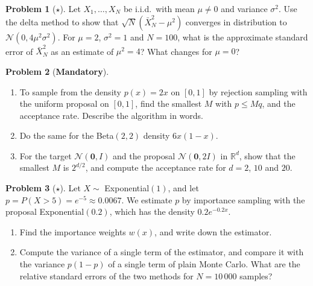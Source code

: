 \documentclass[11pt]{article}
\theoremstyle{definition}
\newtheorem{problem}{Problem}[section]
\newcommand{\mandatory}{\textcolor{red!70!black}{\textbf{Mandatory}}}
\begin{document}
\begin{problem}[$\star$]\label{pr:delta-method}
    Let $X_1, \ldots, X_N$ be i.i.d.\ with mean $\mu \neq 0$ and variance $\sigma^2$. Use the delta method to show that $\sqrt{N}(\bar X_N^2 - \mu^2)$ converges in distribution to $\mathcal{N}(0, 4\mu^2\sigma^2)$. For $\mu = 2$, $\sigma^2 = 1$ and $N = 100$, what is the approximate standard error of $\bar X_N^2$ as an estimate of $\mu^2 = 4$? What changes for $\mu = 0$?
\end{problem}

\begin{problem}[\mandatory]\label{pr:rejection}
    \begin{enumerate}[label=(\alph*)]
        \item To sample from the density $p(x) = 2x$ on $[0, 1]$ by rejection sampling with the uniform proposal on $[0, 1]$, find the smallest $M$ with $p \leq Mq$, and the acceptance rate. Describe the algorithm in words.
        \item Do the same for the Beta$(2, 2)$ density $6x(1 - x)$.
        \item For the target $\mathcal{N}(\mathbf{0}, I)$ and the proposal $\mathcal{N}(\mathbf{0}, 2I)$ in $\mathbb{R}^d$, show that the smallest $M$ is $2^{d/2}$, and compute the acceptance rate for $d = 2$, $10$ and $20$.
    \end{enumerate}
\end{problem}

\begin{problem}[$\star$]\label{pr:importance}
    Let $X \sim$ Exponential$(1)$, and let $p = P(X > 5) = e^{-5} \approx 0.0067$. We estimate $p$ by importance sampling with the proposal Exponential$(0.2)$, which has the density $0.2e^{-0.2x}$.
    \begin{enumerate}[label=(\alph*)]
        \item Find the importance weights $w(x)$, and write down the estimator.
        \item Compute the variance of a single term of the estimator, and compare it with the variance $p(1 - p)$ of a single term of plain Monte Carlo. What are the relative standard errors of the two methods for $N = 10\,000$ samples?
    \end{enumerate}
\end{problem}
\end{document}
